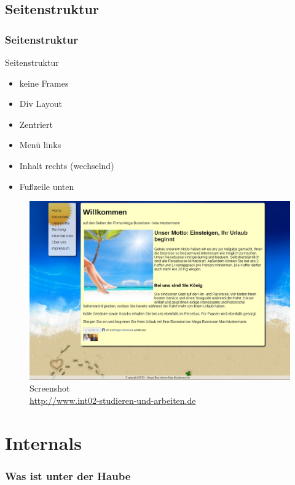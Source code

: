 \documentclass[xcolor=dvipsnames]{beamer}
\begin{document}
\subsection{Seitenstruktur}
\begin{frame} %
  \frametitle{Seitenstruktur} %
  \begin{block}{Seitenstruktur}
	\begin{itemize}
		\item keine Frames
		\item Div Layout
		\item Zentriert
		\item Menü links
		\item Inhalt rechts (wechselnd)
		\item Fußzeile unten
	\end{itemize}
  \end{block}
\end{frame}


\begin{frame}
	\begin{figure}
	\includegraphics[scale=0.4]{screenshot_website.png}
	\caption{Screenshot \\ \tiny{\textcolor{gray}				{\url{http://www.int02-studieren-und-arbeiten.de}}}}
	\end{figure}
\end{frame}

\section{Internals}
\begin{frame}[shrink] %
  \frametitle{Was ist unter der Haube} %
\end{frame}
\end{document}
